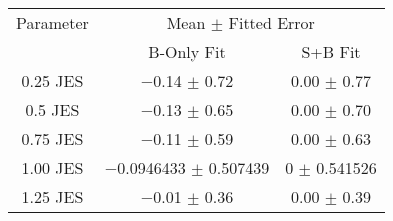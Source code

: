 \begin{scriptsize}
\begin{table}
\centering
\begin{tabular}{ccc}
\toprule
Parameter & \multicolumn{2}{c}{{Mean $\pm$ Fitted Error}}\\
 & {B-Only Fit} & {S+B Fit}\\
\midrule
\num{0.25} JES & \num{-0.14} $\pm$ \num{0.72} & \num{+0.00} $\pm$ \num{0.77}\\
\num{0.5} JES & \num{-0.13} $\pm$ \num{0.65} & \num{+0.00} $\pm$ \num{0.70}\\
\num{0.75} JES & \num{-0.11} $\pm$ \num{0.59} & \num{+0.00} $\pm$ \num{0.63}\\
\num{1.00} JES & \num{-0.0946433} $\pm$ \num{0.507439} & \num{0} $\pm$ \num{0.541526}\\
\num{1.25} JES & \num{-0.01} $\pm$ \num{0.36} & \num{+0.00} $\pm$ \num{0.39}\\
\bottomrule
\end{tabular}
\end{table}
\end{scriptsize}
